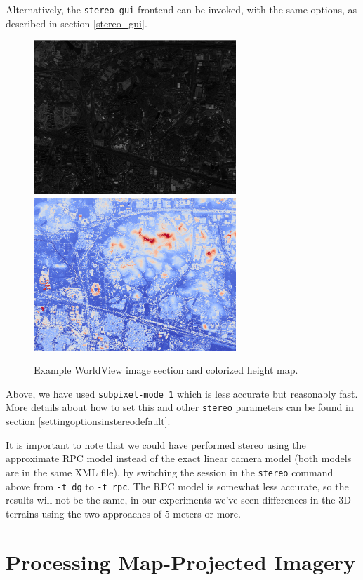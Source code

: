 Alternatively, the \texttt{stereo\_gui} frontend can be invoked, with
the same options, as described in section \ref{stereo_gui}.

\begin{figure}[h!]
\centering
  \includegraphics[width=3.0in]{images/examples/dg/wv_tutorial_input.png}
  \includegraphics[width=3.0in]{images/examples/dg/wv_tutorial_colormap.png}
\caption{Example WorldView image section and colorized height map.}
\label{fig:dg-nomap-example}
\end{figure}

Above, we have used \texttt{subpixel-mode 1} which is less accurate but
reasonably fast.  More details about how to set this and other
\texttt{stereo} parameters can be found in section
\ref{settingoptionsinstereodefault}.

It is important to note that we could have performed stereo using the
approximate RPC model instead of the exact linear camera model (both
models are in the same XML file), by switching the session in the
\texttt{stereo} command above from \texttt{-t dg} to \texttt{-t
rpc}. The RPC model is somewhat less accurate, so the results will not
be the same, in our experiments we've seen differences in the 3D
terrains using the two approaches of 5 meters or more.

\section{Processing Map-Projected Imagery}
\label{mapproj}

